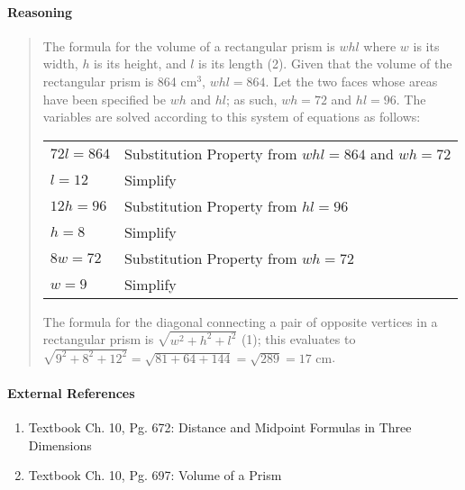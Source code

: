 \documentclass[letterpaper,12pt,twoside]{report}
\begin{document}
	\paragraph{Reasoning}
	\begin{quotation}
		
		The formula for the volume of a rectangular prism is $whl$ where $w$ is its width, $h$ is its height, and $l$ is its length (2). Given that the volume of the rectangular prism is 864 $\text{cm}^3$, $whl=864$. Let the two faces whose areas have been specified be $wh$ and $hl$; as such, $wh=72$ and $hl=96$. The variables are solved according to this system of equations as follows:
		
		\begin{center}
			\begin{tabular}{l | l}
				$72l=864$ & Substitution Property from $whl=864$ and $wh=72$ \\
				$l=12$ & Simplify \\
				\hline
				$12h=96$ & Substitution Property from $hl=96$ \\
				$h=8$ & Simplify \\
				\hline
				$8w=72$ & Substitution Property from $wh=72$ \\
				$w=9$ & Simplify
			\end{tabular}
		\end{center}
		
		The formula for the diagonal connecting a pair of opposite vertices in a rectangular prism is $\sqrt{w^2+h^2+l^2}$ (1); this evaluates to $\sqrt{9^2+8^2+12^2}=\sqrt{81+64+144}=\sqrt{289}=\boxed{17 \text{ cm}}$.
	\end{quotation}
	
	\paragraph{External References}
	
	\begin{enumerate}
		\item Textbook Ch. 10, Pg. 672: Distance and Midpoint Formulas in Three Dimensions
		\item Textbook Ch. 10, Pg. 697: Volume of a Prism
	\end{enumerate}
	
\end{document}
